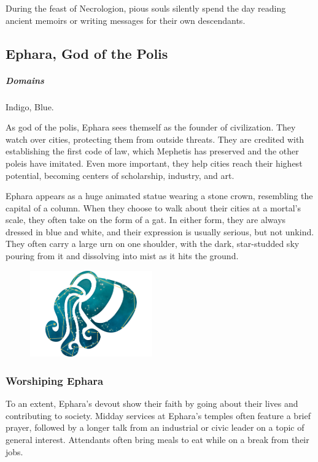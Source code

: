         During the feast of Necrologion, pious souls silently spend the day reading ancient memoirs or writing messages for their own descendants.
\subsection*{Ephara, God of the Polis} \label{ssec::ephara}
    \subparagraph{Domains} Indigo, Blue.

    As god of the polis, Ephara sees themself as the founder of civilization.
    They watch over cities, protecting them from outside threats.
    They are credited with establishing the first code of law, which Mephetis has preserved and the other poleis have imitated.
    Even more important, they help cities reach their highest potential, becoming centers of scholarship, industry, and art.

    Ephara appears as a huge animated statue wearing a stone crown, resembling the capital of a column.
    When they choose to walk about their cities at a mortal's scale, they often take on the form of a gat.
    In either form, they are always dressed in blue and white, and their expression is usually serious, but not unkind.
    They often carry a large urn on one shoulder, with the dark, star-studded sky pouring from it and dissolving into mist as it hits the ground.

    \begin{figure}[b]
        \centering
        \includegraphics[width=0.47\textwidth]{02viphoger/img/10s_ephara.png}
    \end{figure}

    \subsubsection{Worshiping Ephara}
        To an extent, Ephara's devout show their faith by going about their lives and contributing to society.
        Midday services at Ephara's temples often feature a brief prayer, followed by a longer talk from an industrial or civic leader on a topic of general interest.
        Attendants often bring meals to eat while on a break from their jobs.


